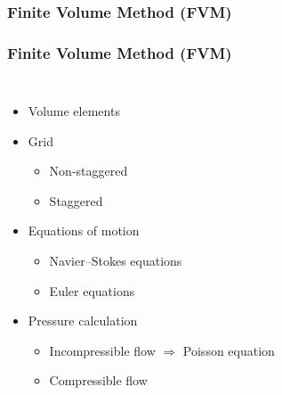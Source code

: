 \subsubsection{Finite Volume Method (FVM)}


\begin{frame}
\frametitle{Finite Volume Method (FVM)}
\begin{columns}[c]

\begin{itemize}[<+(1)->]
\item Volume elements
\item Grid
\begin{itemize}[<+(1)->]
\item Non-staggered
\setcounter{nonstaggeredpauses}{\thebeamerpauses}
\item Staggered
\setcounter{staggeredpauses}{\thebeamerpauses}
\end{itemize}
\item Equations of motion
\begin{itemize}[<+(1)->]
\item Navier--Stokes equations
\item Euler equations
\end{itemize}
\item Pressure calculation
\begin{itemize}[<+(1)->]
\item Incompressible flow $\Rightarrow$ Poisson equation
\item Compressible flow
\end{itemize}
\end{itemize}



\end{columns}
\end{frame}

